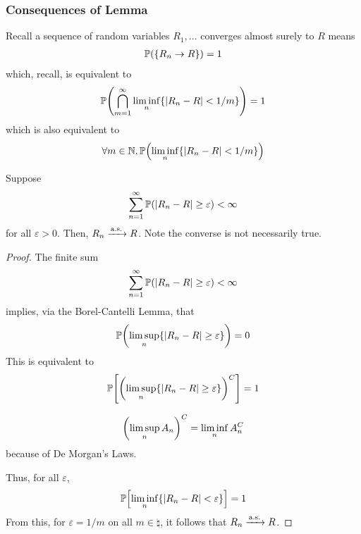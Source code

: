 \subsubsection{Consequences of Lemma}
Recall a sequence of random variables $R_1, \ldots$ converges almost surely to $R$ means
\begin{align}
    \mathbb{P}(\{ R_n \to R \}) = 1
\end{align}
which, recall, is equivalent to
\begin{align}
    \mathbb{P}\qty(\bigcap_{m=1}^\infty \liminf_n \{ \abs{R_n - R} < 1/m \}) = 1
\end{align}
which is also equivalent to
\begin{align}
    \forall m \in \mathbb{N}, \mathbb{P}\qty(\liminf_n \{ \abs{R_n - R} < 1/m \})
\end{align}

\begin{proposition}
    Suppose
    \begin{align}
        \sum_{n=1}^\infty \mathbb{P}\qty(\abs{R_n - R} \ge \varepsilon) < \infty
    \end{align}
    for all $\varepsilon > 0$. Then, $R_n \ce{->[\text{a.s.}]} R$. Note the converse is not necessarily true.
\end{proposition}
\begin{proof}
    The finite sum
    \begin{align}
        \sum_{n=1}^\infty \mathbb{P}\qty(\abs{R_n - R} \ge \varepsilon) < \infty
    \end{align}
    implies, via the Borel-Cantelli Lemma, that
    \begin{align}
        \mathbb{P}\qty(\limsup_n \{ \abs{R_n - R} \ge \varepsilon \}) = 0
    \end{align}
    This is equivalent to
    \begin{align}
        \mathbb{P}\qty[\qty(\limsup_n \{ \abs{R_n - R} \ge \varepsilon \})^C] = 1
    \end{align}
    
    \begin{aside}
        \begin{align}
            \qty(\limsup_n A_n)^C = \liminf_n A_n^C
        \end{align}
        because of De Morgan's Laws.
    \end{aside}

    Thus, for all $\varepsilon$,
    \begin{align}
        \mathbb{P}\qty[\liminf_n \{ \abs{R_n - R} < \varepsilon \}] = 1
    \end{align}
    From this, for $\varepsilon = 1/m$ on all $m \in \natural$, it follows that $R_n \ce{->[\text{a.s.}]} R$.
\end{proof}

